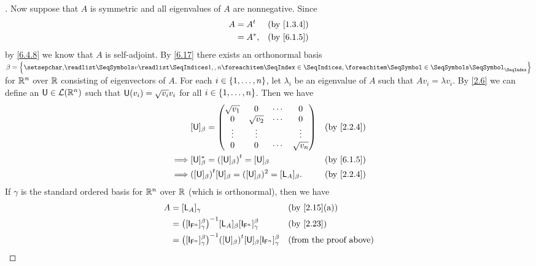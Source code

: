 \begin{proof}[]
  Now suppose that \(A\) is symmetric and all eigenvalues of \(A\) are nonnegative.
  Since
  \begin{align*}
    A & = \tp{A} &  & \text{(by \cref{1.3.4})} \\
      & = A^*,   &  & \text{(by \cref{6.1.5})}
  \end{align*}
  by \cref{6.4.8} we know that \(A\) is self-adjoint.
  By \cref{6.17} there exists an orthonormal basis \(\beta = \set{\seq{v}{1,,n}}\) for \(\mathsf{\mathbb{R}}^n\) over \(\mathbb{R}\) consisting of eigenvectors of \(A\).
  For each \(i \in \left\lbrace1, \dots, n\right\rbrace\), let \(\lambda_i\) be an eigenvalue of \(A\) such that \(A v_i = \lambda v_i\).
  By \cref{2.6} we can define an \(\mathsf{U} \in \mathcal{L}(\mathsf{\mathbb{R}}^n)\) such that \(\mathsf{U}(v_i) = \sqrt{v_i} v_i\) for all \(i \in \left\lbrace1, \dots, n\right\rbrace\).
  Then we have
  \begin{align*}
             & [\U]_{\beta} = \begin{pmatrix}
                                \sqrt{v_1} & 0          & \cdots & 0          \\
                                0          & \sqrt{v_2} & \cdots & 0          \\
                                \vdots     & \vdots     &        & \vdots     \\
                                0          & 0          & \cdots & \sqrt{v_n}
                              \end{pmatrix}                      &  & \text{(by \cref{2.2.4})}                     \\
    \implies & [\U]_{\beta}^* = \tp{([\U]_{\beta})} = [\U]_{\beta}                   &  & \text{(by \cref{6.1.5})} \\
    \implies & \tp{([\U]_{\beta})} [\U]_{\beta} = ([\U]_{\beta})^2 = [\L_A]_{\beta}. &  & \text{(by \cref{2.2.4})}
  \end{align*}
  If \(\gamma\) is the standard ordered basis for \(\mathsf{\mathbb{R}}^n\) over \(\mathbb{R}\) (which is orthonormal), then we have
  \begin{align*}
    A & = [\L_A]_{\gamma}                                                                                              &  & \text{(by \cref{2.15}(a))}      \\
      & = \pa{[\IT[\vs{F}^n]]_{\gamma}^{\beta}}^{-1} [\L_A]_{\beta} [\IT[\vs{F}^n]]_{\gamma}^{\beta}                   &  & \text{(by \cref{2.23})}         \\
      & = \pa{[\IT[\vs{F}^n]]_{\gamma}^{\beta}}^{-1} \tp{([\U]_{\beta})} [\U]_{\beta} [\IT[\vs{F}^n]]_{\gamma}^{\beta} &  & \text{(from the proof above)}   \\

\end{align*}
\end{proof}
